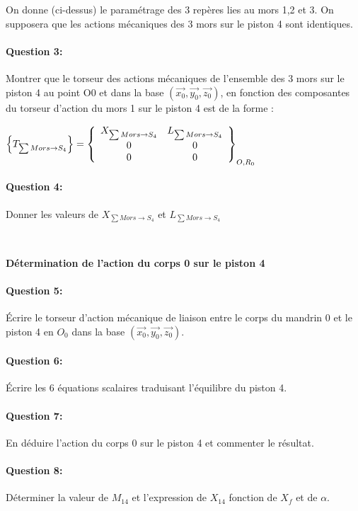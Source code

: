 On donne (ci-dessus) le paramétrage des 3 repères lies au mors 1,2 et 3. On supposera que les actions mécaniques des 3 mors sur le piston 4 sont identiques. 

\paragraph{Question 3:} Montrer que le torseur des actions mécaniques de l'ensemble des 3 mors sur le piston 4 au point O0 et dans la base $(\overrightarrow{x_0},\overrightarrow{y_0},\overrightarrow{z_0})$, en fonction des composantes du torseur d'action du mors 1 sur le piston 4 est de la forme : 

$\left\{T_{\sum Mors \rightarrow S_4}\right\}=\left\{
  \begin{array}{c c}
  X_{\sum Mors \rightarrow S_4} & L_{\sum Mors \rightarrow S_4} \\
  0 & 0 \\
  0 & 0
  \end{array}\right\}_{O,R_0}$

\paragraph{Question 4:} Donner les valeurs de $X_{\sum Mors \rightarrow S_4}$ et $L_{\sum Mors \rightarrow S_4}$

~\

\textbf{Détermination de l'action du corps 0 sur le piston 4}

\paragraph{Question 5:} Écrire le torseur d'action mécanique de liaison entre le corps du mandrin 0 et le piston 4 en $O_0$ dans la base $(\overrightarrow{x_0},\overrightarrow{y_0},\overrightarrow{z_0})$. 
 
\paragraph{Question 6:} Écrire les 6 équations scalaires traduisant l'équilibre du piston 4. 

\paragraph{Question 7:} En déduire l'action du corps 0 sur le piston 4 et commenter le résultat. 

\paragraph{Question 8:} Déterminer la valeur de $M_{14}$ et l'expression de $X_{14}$ fonction de $X_f$ et de $\alpha$.

